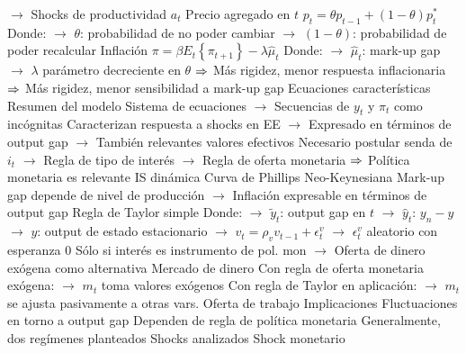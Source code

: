 \documentclass{nuevotema}
\begin{document}
\begin{esquemal}
				\4[] $\to$ Shocks de productividad $a_t$
				\4 Precio agregado en $t$
				\4[] $p_t = \theta p_{t-1} + (1-\theta) p_t^*$
				\4[] Donde:
				\4[] $\to$ $\theta$: probabilidad de no poder cambiar
				\4[] $\to$ $(1-\theta)$: probabilidad de poder recalcular
				\4 Inflación
				\4[] $\pi = \beta E_t \left\lbrace \pi_{t+1} \right\rbrace - \lambda \hat{\mu}_t$
				\4[] Donde:
				\4[] $\to$ $\hat{\mu}_t$: mark-up gap
				\4[] $\to$ $\lambda$ parámetro decreciente en $\theta$
				\4[] $\Rightarrow$ Más rigidez, menor respuesta inflacionaria
				\4[] $\Rightarrow$ Más rigidez, menor sensibilidad a mark-up gap
			\3 Ecuaciones características
				\4 Resumen del modelo
				\4[] Sistema de ecuaciones
				\4[] $\to$ Secuencias de $y_t$ y $\pi_t$ como incógnitas
				\4[] Caracterizan respuesta a shocks en EE
				\4[] $\to$ Expresado en términos de output gap
				\4[] $\to$ También relevantes valores efectivos
				\4[] Necesario postular senda de $i_t$
				\4[] $\to$ Regla de tipo de interés
				\4[] $\to$ Regla de oferta monetaria
				\4[] $\Rightarrow$ Política monetaria es relevante
				\4[DIS] IS dinámica
				\4[] 
				\4[NKPC] Curva de Phillips Neo-Keynesiana
				\4[] 
				\4[] Mark-up gap depende de nivel de producción
				\4[] $\to$ Inflación expresable en términos de output gap
				\4[TR] Regla de Taylor simple
				\4[] 
				\4[] Donde:
				\4[] $\to$ $\tilde{y}_t$: output gap en $t$
				\4[] $\to$ $\hat{y}_t$: $y_n - y$
				\4[] $\to$ $y$: output de estado estacionario
				\4[] $\to$ $v_t=\rho_v v_{t-1} + \epsilon_t^v$
				\4[] $\to$ $\epsilon_t^v$ aleatorio con esperanza 0
				\4[] Sólo si interés es instrumento de pol. mon
				\4[] $\to$ Oferta de dinero exógena como alternativa
				\4[MP] Mercado de dinero
				\4[] 
				\4[] Con regla de oferta monetaria exógena:
				\4[] $\to$ $m_t$ toma valores exógenos
				\4[] Con regla de Taylor en aplicación:
				\4[] $\to$ $m_t$ se ajusta pasivamente a otras vars.
				\4[LS] Oferta de trabajo
				\4[] 
		\2 Implicaciones
			\3 Fluctuaciones en torno a output gap
				\4 Dependen de regla de política monetaria
				\4[] Generalmente, dos regímenes planteados
				\4 Shocks analizados
				\4[] Shock monetario

\end{esquemal}
\end{document}
